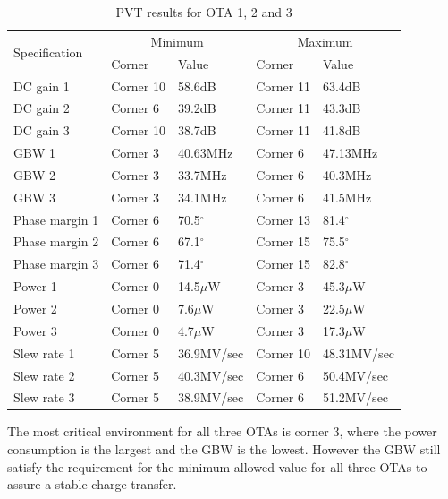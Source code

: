 \begin{table}[H]
\centering
\caption{PVT results for OTA 1, 2 and 3}
\label{pvt_ota}
\begin{tabular}{l|l|l|l|l}
\hline
\multirow{2}{*}{Specification} & \multicolumn{2}{c|}{Minimum} & \multicolumn{2}{c}{Maximum} \\\cline{2-5}
            & Corner & Value & Corner & Value  \\\hline
            DC gain 1 &Corner 10 & 58.6dB & Corner 11 & 63.4dB \\
            DC gain 2 & Corner 6 & 39.2dB & Corner 11 & 43.3dB \\
            DC gain 3 & Corner 10 & 38.7dB & Corner 11 & 41.8dB \\\hline
            GBW 1    & Corner 3 & 40.63MHz & Corner 6 & 47.13MHz \\
            GBW 2    & Corner 3 & 33.7MHz & Corner 6 & 40.3MHz \\
            GBW 3    & Corner 3 & 34.1MHz & Corner 6 & 41.5MHz \\\hline
            Phase margin 1  & Corner 6 & 70.5$^\circ$ & Corner 13 & 81.4$^\circ$ \\
            Phase margin 2  & Corner 6 & 67.1$^\circ$ & Corner 15 & 75.5$^\circ$ \\
            Phase margin 3  & Corner 6 & 71.4$^\circ$ & Corner 15 & 82.8$^\circ$ \\\hline
            Power 1  & Corner 0 & 14.5$\mu$W & Corner 3 & 45.3$\mu$W \\
            Power 2  & Corner 0 & 7.6$\mu$W & Corner 3 & 22.5$\mu$W \\
            Power 3  & Corner 0 & 4.7$\mu$W & Corner 3 & 17.3$\mu$W \\\hline
            Slew rate 1  & Corner 5 & 36.9MV/sec & Corner 10 & 48.31MV/sec \\
            Slew rate 2  & Corner 5 & 40.3MV/sec & Corner 6 & 50.4MV/sec \\
            Slew rate 3  & Corner 5 & 38.9MV/sec & Corner 6 & 51.2MV/sec \\
            
\hline            
\end{tabular}
\end{table}

The most critical environment for all three OTAs is corner 3, where the power consumption is the largest and the GBW is the lowest. However the GBW still satisfy the requirement for the minimum allowed value for all three OTAs to assure a stable charge transfer.

